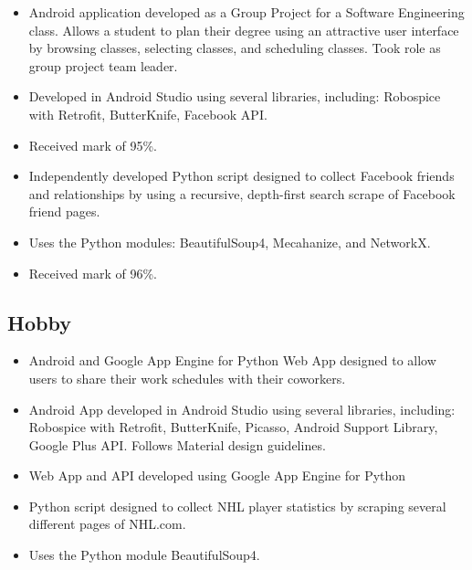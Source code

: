 \documentclass[11pt,letterpaper,sans]{moderncv}        %
\begin{document}
{
  \begin{itemize}
    \item Android application developed as a Group Project for a Software Engineering class. Allows a student to plan their degree using an attractive user interface by browsing classes, selecting classes, and scheduling classes. Took role as group project team leader.
    \item Developed in Android Studio using several libraries, including: Robospice with Retrofit, ButterKnife, Facebook API.
    \item Received mark of 95\%.
  \end{itemize}
}

{
  \begin{itemize}
    \item Independently developed Python script designed to collect Facebook friends and relationships by using a recursive, depth-first search scrape of Facebook friend pages.
    \item Uses the Python modules: BeautifulSoup4, Mecahanize, and NetworkX.
    \item Received mark of 96\%.
  \end{itemize}
}


\vspace*{-0.5cm} %
\subsection{Hobby}

{
  \begin{itemize}
    \item Android and Google App Engine for Python Web App designed to allow users to share their work schedules with their coworkers.
    \item Android App developed in Android Studio using several libraries, including: Robospice with Retrofit, ButterKnife, Picasso, Android Support Library, Google Plus API. Follows Material design guidelines.
    \item Web App and API developed using Google App Engine for Python
  \end{itemize}
}

{
  \begin{itemize}
    \item Python script designed to collect NHL player statistics by scraping several different pages of NHL.com.
    \item Uses the Python module BeautifulSoup4.
  \end{itemize}
}
\end{document}
